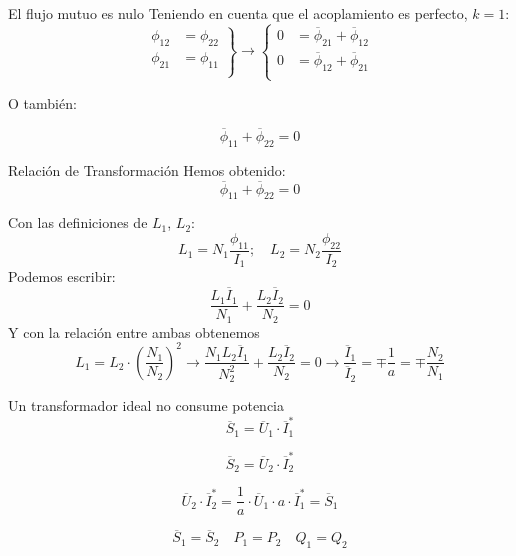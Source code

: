 \documentclass[aspectratio=169, usenames,svgnames,dvipsnames]{beamer}
\begin{document}
\begin{frame}[label={sec:orgcb6644b}]{El flujo mutuo es nulo}
Teniendo en cuenta que el acoplamiento es perfecto, \(k = 1\):
\[
  \left.
    \begin{array}{ll}
      \phi_{12} &= \phi_{22}\\
      \phi_{21} &= \phi_{11}\\
    \end{array} \right\} 
  \rightarrow
  \left\{
    \begin{array}{ll}
      0 &= \overline{\phi}_{21} + \overline{\phi}_{12}\\
      0 &= \overline{\phi}_{12} + \overline{\phi}_{21}\\
    \end{array}\right.
\]

O también:

\[
  \boxed{\overline{\phi}_{11} + \overline{\phi}_{22} = 0}
\]
\end{frame}
\begin{frame}[label={sec:org9725857}]{Relación de Transformación}
Hemos obtenido:
\[
  \overline{\phi}_{11} + \overline{\phi}_{22} = 0
\]

Con las definiciones de \(L_1\), \(L_2\):
\[
  L_1 = N_1 \frac{\phi_{11}}{I_1}; \quad L_2 = N_2 \frac{\phi_{22}}{I_2}
\]
Podemos escribir:
\[
  \frac{L_1 \overline{I}_1}{N_1} + \frac{L_2 \overline{I}_2}{N_2} = 0
\]
Y con la relación entre ambas obtenemos
\[
  L_1 = L_2 \cdot \left(\frac{N_1}{N_2}\right)^2
  \rightarrow
  \frac{N_1L_2 \overline{I}_1}{N^2_2} + \frac{L_2 \overline{I}_2}{N_2} = 0
  \rightarrow
  \boxed{\frac{\overline{I}_1}{\overline{I}_2} = \mp \frac{1}{a} = \mp \frac{N_2}{N_1}}
\]
\end{frame}
\begin{frame}[label={sec:orge860535}]{Un transformador ideal no consume potencia}
\[
  \overline{S}_1 = \overline{U}_1 \cdot \overline{I}_1^*
\]

\[
  \overline{S}_2 = \overline{U}_2 \cdot \overline{I}_2^* 
\]

\[
  \overline{U}_2 \cdot \overline{I}_2^* = \frac{1}{a} \cdot \overline{U}_1 \cdot a \cdot \overline{I}_1^* = \overline{S}_1
\]

\[
  \boxed{\overline{S}_1 = \overline{S}_2}
  \quad
  \boxed{P_1 = P_2}
  \quad
  \boxed{Q_1 = Q_2}
\]
\end{frame}
\end{document}
